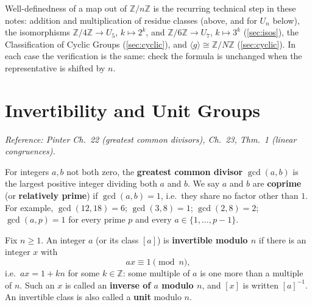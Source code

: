 \documentclass[11pt]{report}
\begin{document}
\begin{center}
\label{fig:descent}
\end{center}


\begin{rembox}\label{rem:where-this-used}
Well-definedness of a map out of $\mathbb{Z}/n\mathbb{Z}$ is the recurring technical step in these notes: addition and multiplication of residue classes (above, and for $U_n$ below), the isomorphisms $\mathbb{Z}/4\mathbb{Z} \to U_5$, $k \mapsto 2^k$, and $\mathbb{Z}/6\mathbb{Z} \to U_7$, $k \mapsto 3^k$ (\ref{sec:isos}), the Classification of Cyclic Groups (\ref{sec:cyclic}), and $\langle g \rangle \cong \mathbb{Z}/N\mathbb{Z}$ (\ref{sec:cyclic}). In each case the verification is the same: check the formula is unchanged when the representative is shifted by $n$.
\end{rembox}

\section{Invertibility and Unit Groups}\label{sec:units}

\textit{Reference: Pinter Ch.\ 22 (greatest common divisors), Ch.\ 23, Thm.\ 1 (linear congruences).}

\begin{defbox}\label{def:greatest-common-divisor-coprime}
For integers $a, b$ not both zero, the \textbf{greatest common divisor} $\gcd(a, b)$ is the largest positive integer dividing both $a$ and $b$. We say $a$ and $b$ are \textbf{coprime} (or \textbf{relatively prime}) if $\gcd(a, b) = 1$, i.e.\ they share no factor other than $1$. For example, $\gcd(12, 18) = 6$; $\gcd(3, 8) = 1$; $\gcd(2, 8) = 2$; $\gcd(a, p) = 1$ for every prime $p$ and every $a \in \{1, \ldots, p-1\}$.
\end{defbox}

\begin{defbox}\label{def:invertibility-modulo-n}
Fix $n \geq 1$. An integer $a$ (or its class $[a]$) is \textbf{invertible modulo $n$} if there is an integer $x$ with
\[ ax \equiv 1 \pmod n, \]
i.e.\ $ax = 1 + kn$ for some $k \in \mathbb{Z}$: some multiple of $a$ is one more than a multiple of $n$. Such an $x$ is called an \textbf{inverse of $a$ modulo $n$}, and $[x]$ is written $[a]^{-1}$. An invertible class is also called a \textbf{unit} modulo $n$.
\end{defbox}
\end{document}

